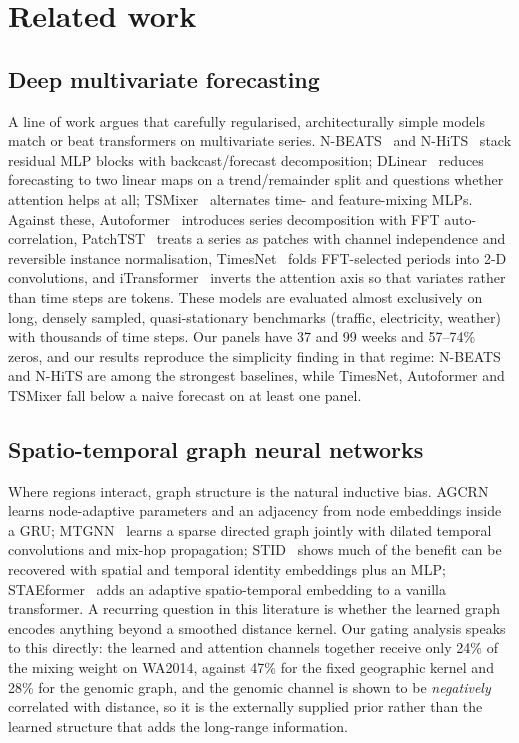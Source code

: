 \section{Related work}\label{sec:related}

\subsection{Deep multivariate forecasting}

A line of work argues that carefully regularised, architecturally simple models match or beat transformers on multivariate series. N-BEATS~\cite{nbeats} and N-HiTS~\cite{nhits} stack residual MLP blocks with backcast/forecast decomposition; DLinear~\cite{dlinear} reduces forecasting to two linear maps on a trend/remainder split and questions whether attention helps at all; TSMixer~\cite{tsmixer} alternates time- and feature-mixing MLPs. Against these, Autoformer~\cite{autoformer} introduces series decomposition with FFT auto-correlation, PatchTST~\cite{patchtst} treats a series as patches with channel independence and reversible instance normalisation, TimesNet~\cite{timesnet} folds FFT-selected periods into 2-D convolutions, and iTransformer~\cite{itransformer} inverts the attention axis so that variates rather than time steps are tokens. These models are evaluated almost exclusively on long, densely sampled, quasi-stationary benchmarks (traffic, electricity, weather) with thousands of time steps. Our panels have 37 and 99 weeks and 57--74\% zeros, and our results reproduce the simplicity finding in that regime: N-BEATS and N-HiTS are among the strongest baselines, while TimesNet, Autoformer and TSMixer fall below a naive forecast on at least one panel.

\subsection{Spatio-temporal graph neural networks}

Where regions interact, graph structure is the natural inductive bias. AGCRN~\cite{agcrn} learns node-adaptive parameters and an adjacency from node embeddings inside a GRU; MTGNN~\cite{mtgnn} learns a sparse directed graph jointly with dilated temporal convolutions and mix-hop propagation; STID~\cite{stid} shows much of the benefit can be recovered with spatial and temporal identity embeddings plus an MLP; STAEformer~\cite{staeformer} adds an adaptive spatio-temporal embedding to a vanilla transformer. A recurring question in this literature is whether the learned graph encodes anything beyond a smoothed distance kernel. Our gating analysis speaks to this directly: the learned and attention channels together receive only 24\% of the mixing weight on WA2014, against 47\% for the fixed geographic kernel and 28\% for the genomic graph, and the genomic channel is shown to be \emph{negatively} correlated with distance, so it is the externally supplied prior rather than the learned structure that adds the long-range information.

